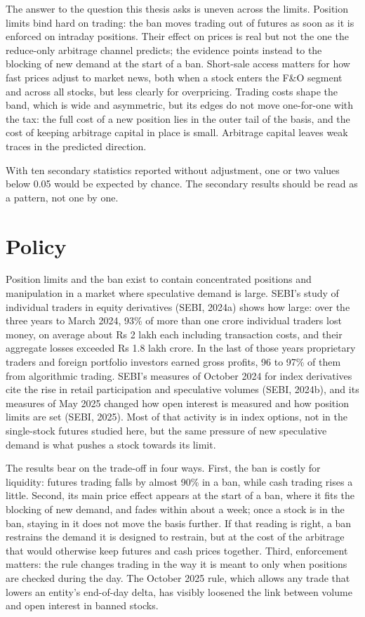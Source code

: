 The answer to the question this thesis asks is uneven across the limits. Position limits bind hard on trading: the ban
moves trading out of futures as soon as it is enforced on intraday positions. Their effect on prices is real but not the
one the reduce-only arbitrage channel predicts; the evidence points instead to the blocking of new demand at the start of
a ban. Short-sale access matters for how fast prices adjust to market news, both when a stock enters the F\&O segment and
across all stocks, but less clearly for overpricing. Trading costs shape the band, which is wide and asymmetric, but its
edges do not move one-for-one with the tax: the full cost of a new position lies in the outer tail of the basis, and the
cost of keeping arbitrage capital in place is small. Arbitrage capital leaves weak traces in the predicted direction.

With ten secondary statistics reported without adjustment, one or two values below 0.05 would be expected by chance. The
secondary results should be read as a pattern, not one by one.

\section{Policy}
Position limits and the ban exist to contain concentrated positions and manipulation in a market where speculative
demand is large. SEBI's study of individual traders in equity derivatives (SEBI, 2024a) shows how large: over the three
years to March 2024, 93\% of more than one crore individual traders lost money, on average about Rs 2 lakh each including
transaction costs, and their aggregate losses exceeded Rs 1.8 lakh crore. In the last of those years proprietary traders and
foreign portfolio investors earned gross profits, 96 to 97\% of them from algorithmic trading. SEBI's measures of October 2024 for index
derivatives cite the rise in retail participation and speculative volumes (SEBI, 2024b), and its measures of May 2025
changed how open interest is measured and how position limits are set (SEBI, 2025). Most of that
activity is in index options, not in the single-stock futures studied here, but the same pressure of new speculative
demand is what pushes a stock towards its limit.

The results bear on the trade-off in four ways. First, the ban is costly for liquidity: futures trading falls by almost
90\% in a ban, while cash trading rises a little. Second, its main price effect appears at the start of a ban, where it
fits the blocking of new demand, and fades within about a week; once a stock is in the ban, staying in it does not move
the basis further. If that reading is right, a ban restrains the demand it is designed to restrain, but at the cost of the
arbitrage that would otherwise keep futures and cash prices together. Third, enforcement matters: the rule changes trading in the way it
is meant to only when positions are checked during the day. The October 2025 rule, which allows any trade that lowers an
entity's end-of-day delta, has visibly loosened the link between volume and open interest in banned stocks.

